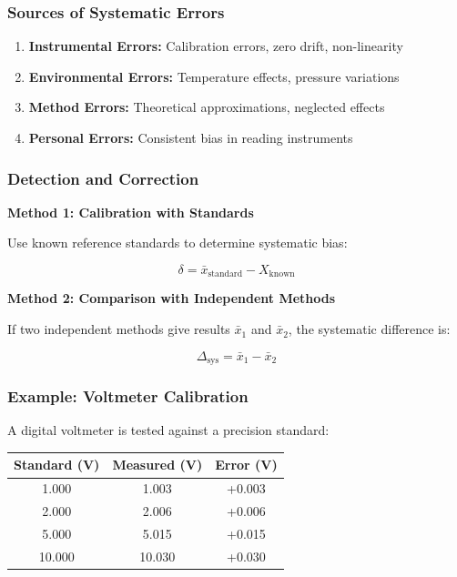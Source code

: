 \documentclass[twoside]{book}
\begin{document}
\subsubsection{Sources of Systematic Errors}

\begin{enumerate}
\item \textbf{Instrumental Errors:} Calibration errors, zero drift, non-linearity
\item \textbf{Environmental Errors:} Temperature effects, pressure variations
\item \textbf{Method Errors:} Theoretical approximations, neglected effects
\item \textbf{Personal Errors:} Consistent bias in reading instruments
\end{enumerate}

\subsubsection{Detection and Correction}

\textbf{Method 1: Calibration with Standards}

Use known reference standards to determine systematic bias:

\begin{equation}
\delta = \bar{x}_{\text{standard}} - X_{\text{known}}
\end{equation}

\textbf{Method 2: Comparison with Independent Methods}

If two independent methods give results $\bar{x}_1$ and $\bar{x}_2$, the systematic difference is:

\begin{equation}
\Delta_{\text{sys}} = \bar{x}_1 - \bar{x}_2
\end{equation}

\subsubsection{Example: Voltmeter Calibration}

A digital voltmeter is tested against a precision standard:

\begin{center}
\begin{tabular}{ccc}
\toprule
Standard (V) & Measured (V) & Error (V) \\
\midrule
1.000 & 1.003 & +0.003 \\
2.000 & 2.006 & +0.006 \\
5.000 & 5.015 & +0.015 \\
10.000 & 10.030 & +0.030 \\
\bottomrule
\end{tabular}
\end{center}
\end{document}
